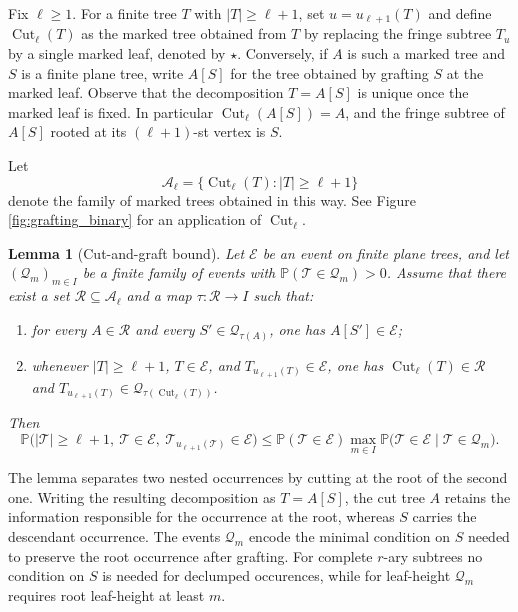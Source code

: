 \documentclass[a4paper,11pt]{article}
\newtheorem{lemma}[theorem]{Lemma}
\DeclareRobustCommand{\P}{\mathbb{P}}
\DeclareRobustCommand{\1}{\mathbf{1}}
\begin{document}
  Fix $\ell\ge1$. For a finite tree $T$ with $|T|\ge \ell+1$, set $u=u_{\ell+1}(T)$ and
  define $\operatorname{Cut}_\ell(T)$ as the marked tree obtained from $T$ by
  replacing the fringe subtree $T_u$ by a single marked leaf, denoted by
  $\star$. Conversely, if $A$ is such a marked tree and $S$ is a finite plane
  tree, write $A[S]$ for the tree obtained by grafting $S$ at the marked leaf.
  Observe that the decomposition $T=A[S]$ is unique once the marked leaf is
  fixed.  In particular $\operatorname{Cut}_\ell(A[S])=A$, and the fringe subtree of $A[S]$ rooted
at its $(\ell+1)$-st vertex is $S$.
  
  Let
    $$
    \mathscr A_\ell=\{\operatorname{Cut}_\ell(T): |T|\ge \ell+1\}
  $$
  denote  the family of marked trees obtained in this way. See Figure \ref{fig:grafting_binary} for an application of $\operatorname{Cut}_\ell$.
  
  
\begin{lemma}[Cut-and-graft bound]
\label{lem:cut_graft}
Let $\mathcal E$ be an event on finite plane trees, and let
$(\mathcal Q_m)_{m\in I}$ be a finite family of events with
$\P(\mathcal T\in\mathcal Q_m)>0$. Assume that there exist a set
$\mathscr R\subseteq\mathscr A_\ell$ and a map
$\tau:\mathscr R\to I$ such that:
\begin{enumerate}
\item[(a)] for every $A\in\mathscr R$ and every
$S'\in\mathcal Q_{\tau(A)}$, one has $A[S']\in\mathcal E$;
\item[(b)] whenever $|T|\ge\ell+1$, $T\in\mathcal E$, and
$T_{u_{\ell+1}(T)}\in\mathcal E$, one has
$
\operatorname{Cut}_\ell(T)\in\mathscr R$
and
$T_{u_{\ell+1}(T)}
\in
\mathcal Q_{\tau(\operatorname{Cut}_\ell(T))}$.
\end{enumerate}
Then
$$\P\bigl(
|\mathcal T|\ge\ell+1,\
\mathcal T\in\mathcal E,\
\mathcal T_{u_{\ell+1}(\mathcal T)}\in\mathcal E
\bigr)
\leq 
\P(\mathcal T\in\mathcal E)
\max_{m\in I}
\P\bigl(
\mathcal T\in\mathcal E
\mid
\mathcal T\in\mathcal Q_m
\bigr).
$$
\end{lemma}

The lemma separates two nested occurrences by cutting at the root of the
second one. Writing the resulting decomposition as $T=A[S]$, the cut tree
$A$ retains the information responsible for the occurrence at the root,
whereas $S$ carries the descendant occurrence. 
The events $\mathcal Q_m$ encode the minimal condition on $S$ needed to
preserve the root occurrence after grafting. For complete $r$-ary subtrees no condition on $S$ is needed for declumped occurences, while for
leaf-height $\mathcal Q_m$ requires root leaf-height at least $m$.
\end{document}
